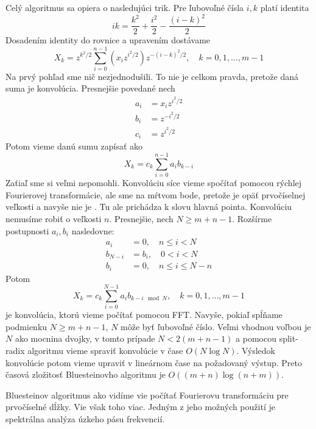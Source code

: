 Celý algoritmus sa opiera o nasledujúci trik. Pre ľubovoľné čísla
$i,k$ platí identita
\begin{equation}
    ik = \frac{k^2}{2} + \frac{i^2}{2} - \frac{(i-k)^2}{2}
\end{equation}
Dosadením identity do rovnice a upravením dostávame
\begin{equation}
    X_k = z^{k^2/2}
        \sum_{i=0}^{n-1} 
            \left(x_i z^{i^2/2} \right)
            z^{-(i-k)^2/2}
        , \quad k = 0,1,\dots,m-1
\end{equation}
Na prvý pohľad sme nič nezjednodušili. To nie je celkom pravda,
pretože daná suma je konvolúcia. Presnejšie povedané nech
\begin{align}
    a_i &= x_i z^{i^2/2} \\
    b_i &= z^{-i^2/2} \\
    c_i &= z^{i^2/2}
\end{align}
Potom vieme danú sumu zapísať ako
\begin{equation}
    X_k = c_k \sum_{i=0}^{n-1} a_i b_{k-i}
\end{equation}
Zaťiaľ sme si veľmi nepomohli. Konvolúciu síce vieme spočítať pomocou
rýchlej Fourierovej transformácie, ale sme na mŕtvom bode, pretože
je opäť prvočíselnej veľkosti a navyše nie je . 
Tu ale prichádza k slovu hlavná pointa.
Konvolúciu nemusíme robiť o veľkosti $n$.
Presnejšie, nech $N\ge m+n -1$.
Rozšírme postupnosti $a_i,b_i$ nasledovne:
\begin{align}
    a_i &=0, \quad n\le i<N \\
    b_{N-i} &= b_{i}, \quad 0 < i < N \\
    b_i &= 0, \quad n\le i \le N-n
\end{align}
Potom
\begin{equation}
    X_k = c_k \sum_{i=0}^{N-1} a_i b_{k-i \mod N},
        \quad k = 0,1,\dots,m-1
\end{equation}
je  konvolúcia, ktorú vieme počítať pomocou FFT.
Navyše, pokiaľ spĺňame podmienku $N\ge m+n-1$, $N$ môže byť ľubovoľné
číslo. Veľmi vhodnou voľbou je $N$ ako mocnina dvojky, v tomto prípade
$N < 2(m+n-1)$ a pomocou split-radix algoritmu vieme spraviť
konvolúcie v čase $O(N \log N)$.
Výsledok konvolúcie potom vieme upraviť v lineárnom čase na požadovaný
výstup. Preto časová zložitosť Bluesteinovho algoritmu je
$O( (m+n) \log (n+m))$.



Bluesteinov algoritmus ako vidíme vie počítať Fourierovu transformáciu
pre prvočíselné dĺžky. Vie však toho viac. Jedným z jeho možných
použití je spektrálna analýza úzkeho pásu frekvencií.

